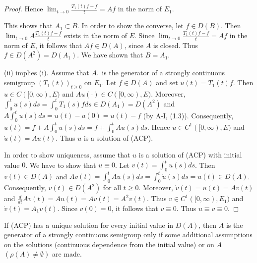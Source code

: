 \begin{proof}
Hence $\lim_{t \to 0} \frac{T_{1}(t)f - f}{t} = Af$ in the norm of $E_{1}$.

This shows that $A_{1} \subset B$.
In order to show the converse, let $f \in D(B)$.
Then $\lim_{t \to 0} A \frac{T_{1}(t)f - f}{t}$ exists in the norm of $E$.
Since $\lim_{t \to 0} \frac{T_{1}(t)f - f}{t} = Af$ in the norm of $E$, it follows that $Af \in D(A)$, since $A$ is closed.
Thus $f \in D(A^{2}) = D(A_{1})$.
We have shown that $B = A_{1}$.

(ii) implies (i).
Assume that $A_{1}$ is the generator of a strongly continuous semigroup $(T_{1}(t))_{t\geq0}$ on $E_{1}$.
Let $f \in D(A)$ and set $u(t) = T_{1}(t)f$.
Then $u \in C([0,\infty),E)$ and $Au(\cdot) \in C([0,\infty),E)$.
Moreover, $\int_{0}^{t} u(s)ds = \int_{0}^{t} T_{1}(s)fds \in D(A_{1}) = D(A^{2})$ and $A\int_{0}^{t} u(s)ds = u(t) - u(0) = u(t) - f$ (by A-I, (1.3)).
Consequently, $u(t) = f + A\int_{0}^{t} u(s)ds = f + \int_{0}^{t} Au(s)ds$.
Hence $u \in C^{1}([0,\infty),E)$ and $\dot{u}(t) = Au(t)$.
Thus $u$ is a solution of (ACP).


In order to show uniqueness, assume that $u$ is a solution of (ACP) with initial value $0$.
We have to show that $u \equiv 0$.
Let $v(t) = \int_{0}^{t} u(s)ds$.
Then $v(t) \in D(A)$ and $Av(t) = \int_{0}^{t} Au(s)ds = \int_{0}^{t} \dot{u}(s)ds = u(t) \in D(A)$.
Consequently, $v(t) \in D(A^{2})$ for all $t\geq0$.
Moreover, $\dot{v}(t) = u(t) = Av(t)$ and $\frac{d}{dt} Av(t) = Au(t) = A\dot{v}(t) = A^{2}v(t)$.
Thus $v \in C^{1}([0,\infty),E_{1})$ and $\dot{v}(t) = A_{1}v(t)$.
Since $v(0) = 0$, it follows that $v \equiv 0$.
Thus $u \equiv v \equiv 0$.
\end{proof}

If (ACP) has a unique solution for every initial value in $D(A)$, then $A$ is the generator of a strongly continuous semigroup only if some additional assumptions on the solutions (continuous dependence from the initial value) or on $A$ $(\rho(A) \neq \emptyset)$ are made.


